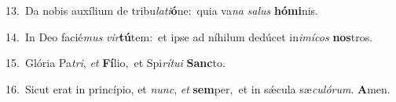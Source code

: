 {\numbfont\textcolor{\numbcolor}{13.}}~Da nobis auxílium de tribu\-\textit{la}\-\textit{ti}\textbf{ó}ne:~\star quia va\textit{na} \textit{sa}\-\textit{lus} \textbf{hó}\-\textbf{mi}nis.\par
{\numbfont\textcolor{\numbcolor}{14.}}~In Deo facié\textit{mus} \textit{vir}\-\textbf{tú}tem:~\star et ipse ad níhilum dedúcet in\-\textit{i}\-\textit{mí}\textit{cos} \textbf{nos}\-tros.\par
{\numbfont\textcolor{\numbcolor}{15.}}~Glória Pa\-\textit{tri}\-, \textit{et} \textbf{Fí}\-lio,~\star et Spi\-\textit{rí}\-\textit{tu}\textit{i} \textbf{Sanc}\-to.\par
{\numbfont\textcolor{\numbcolor}{16.}}~Sicut erat in princípio, et \textit{nunc}\-, \textit{et} \textbf{sem}\-per,~\star et in sǽcula sæ\-\textit{cu}\-\textit{ló}\textit{rum}. \textbf{A}\-men.\par
